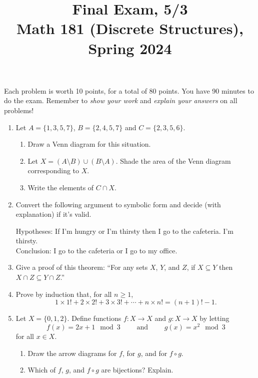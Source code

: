 \documentclass[11pt]{article}
\title{Final Exam, 5/3 \\Math 181 (Discrete Structures), Spring 2024}
\date{}
\begin{document}
\maketitle

\thispagestyle{empty}

\vspace{-1.8cm}

Each problem is worth 10 points, for a total of 80 points. You have 90 minutes to do the exam. Remember to \emph{show your work} and \emph{explain your answers} on all problems!

\begin{enumerate}

\item Let $A=\{1,3,5,7\}$, $B= \{2,4,5,7\}$ and $C = \{2,3,5,6\}$.
\begin{enumerate}
\item Draw a Venn diagram for this situation.
\item Let $X = (A \setminus B) \cup (B \setminus A)$. Shade the area of the Venn diagram corresponding to $X$.
\item Write the elements of $C \cap X$.
\end{enumerate}

\item Convert the following argument to symbolic form and decide (with explanation) if it's valid. 
\smallskip

Hypotheses: If I'm hungry or I'm thirsty then I go to the cafeteria. I'm thirsty. \\ Conclusion: I go to the cafeteria or I go to my office.

\item Give a proof of this theorem: ``For any sets $X$, $Y$, and $Z$, if $X \subseteq Y$ then $X \cap Z \subseteq Y \cap Z$.''

\item Prove by induction that, for all $n \geq 1$,
\[ 1\times 1! + 2 \times 2! + 3 \times 3! + \cdots + n \times n! = (n+1)! - 1.\]

\item Let $X = \{0,1,2\}$. Define functions $f\colon X \to X$ and $g\colon X \to X$ by letting
\[ f(x) = 2x+1 \mod 3 \qquad \textrm{ and } \qquad g(x) = x^2 \mod 3\]
for all $x \in X$.
\begin{enumerate}
\item Draw the arrow diagrams for $f$, for $g$, and for $f\circ g$.
\item Which of $f$, $g$, and $f\circ g$ are bijections? Explain.
\end{enumerate}


\end{enumerate}
\end{document}
